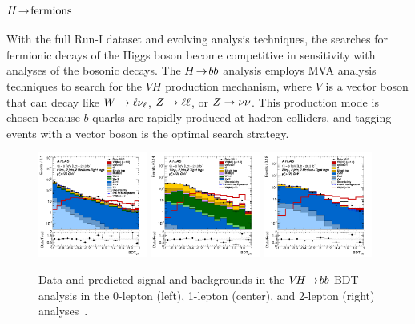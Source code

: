 \subsubsection{$H \!\rightarrow\! \text{fermions}$}

With the full Run-I dataset and evolving analysis techniques, the searches for fermionic decays of the Higgs boson become competitive in sensitivity with analyses of the bosonic decays. The $H \!\rightarrow\! bb$ analysis employs MVA analysis techniques to search for the $VH$ production mechanism, where $V$ is a vector boson that can decay like $W \rightarrow \ell\nu_\ell$, $Z \rightarrow \ell\ell$, or $Z \rightarrow \nu\nu$. This production mode is chosen because $b$-quarks are rapidly produced at hadron colliders, and tagging events with a vector boson is the optimal search strategy. 

\begin{figure}[tp]
  \centering
  \includegraphics[width=0.32\textwidth]{figures/HIGG-2013-23/fig_11a}
  \includegraphics[width=0.32\textwidth]{figures/HIGG-2013-23/fig_12c}
  \includegraphics[width=0.32\textwidth]{figures/HIGG-2013-23/fig_13b}
  \caption{Data and predicted signal and backgrounds in the $V\!H \!\rightarrow\! bb$ BDT analysis in the 0-lepton (left), 1-lepton (center), and 2-lepton (right) analyses~\cite{HIGG-2013-23}.}
  \label{fig:strategy-higgs-yyzzww}
\end{figure}

